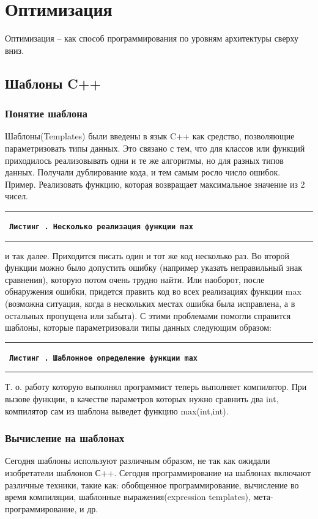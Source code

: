 \documentclass[12pt, a4paper]{article}
\newcommand{\HRule}{\noindent\rule{\linewidth}{0.45mm}}
\newcounter{sourcecode}
\newcommand*{\cppsource}[2]{\par{\HRule \small \tt \bf \noindent \ Листинг \arabic{sourcecode}. {\rm \small #2} \vspace{0.25cm}}%
\addtocounter{sourcecode}{1}  \HRule}
\begin{document}

\newpage
\section{Оптимизация}
Оптимизация -- как способ программирования по уровням архитектуры сверху вниз.

\subsection{Шаблоны C++}

\subsubsection{Понятие шаблона}

Шаблоны(Templates) были введены в язык C++ как средство, позволяющие параметризовать типы данных. Это связано с тем, что для классов или функций приходилось реализовывать одни и те же алгоритмы, но для разных типов данных. Получали дублирование кода, и тем самым росло число ошибок. 
Пример. Реализовать функцию, которая возвращает максимальное значение из 2 чисел.

\cppsource{src/deftemplate.tex}{Несколько реализация функции {\bf max}}

\noindent
и так далее. Приходится писать один и тот же код несколько раз. Во второй функции можно было допустить ошибку (например указать неправильный знак сравнения), которую потом очень трудно найти. Или наоборот, после обнаружения ошибки, придется править код во всех реализациях функции max (возможна ситуация, когда в нескольких местах ошибка была исправлена, а в остальных пропущена или забыта). С этими проблемами помогли справится шаблоны, которые параметризовали типы данных следующим образом:

\cppsource{src/definetemplate.tex}{Шаблонное определение функции {\bf max}}

Т. о. работу которую выполнял программист теперь выполняет компилятор. При вызове функции, в качестве параметров которых нужно сравнить два int, компилятор сам из шаблона выведет функцию max(int,int).
\subsubsection{Вычисление на шаблонах}
Сегодня шаблоны используют различным образом, не так как ожидали изобретатели
шаблонов С++. Сегодня программирование на шаблонах включают различные техники, такие как: обобщенное программирование, вычисление во время компиляции, шаблонные выражения(expression templates), мета-программирование, и др.
\end{document}
